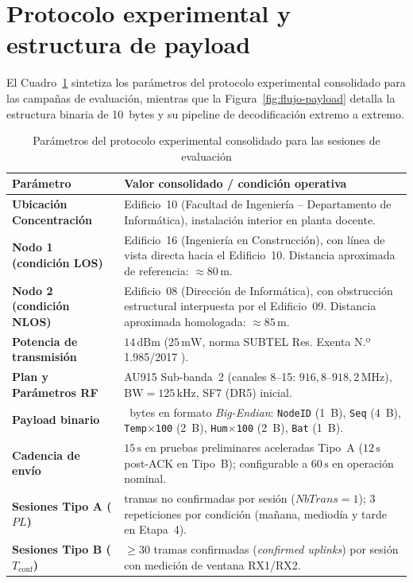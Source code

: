 \documentclass[12pt,oneside,openany,spanish,oldfontcommands]{memoir}
\renewcommand{\arraystretch}{1.15}
\begin{document}
\section{Protocolo experimental y estructura de payload}
\label{sec:protocolo-experimental}

El Cuadro~\ref{tab:protocolo} sintetiza los parámetros del protocolo experimental consolidado para
las campañas de evaluación, mientras que la Figura~\ref{fig:flujo-payload} detalla la estructura
binaria de 10~bytes y su pipeline de decodificación extremo a extremo.

\begin{table}[!htbp]
\centering
\caption{Parámetros del protocolo experimental consolidado para las sesiones de evaluación}
\label{tab:protocolo}
\footnotesize
\setlength{\tabcolsep}{3pt}
\renewcommand{\arraystretch}{1.02}
\begin{tabularx}{\textwidth}{
    >{\raggedright\arraybackslash}p{4.8cm}
    >{\raggedright\arraybackslash}X
}
\toprule
\textbf{Parámetro} & \textbf{Valor consolidado / condición operativa}\\
\midrule
\textbf{Ubicación Concentración} &
Edificio~10 (Facultad de Ingeniería -- Departamento de Informática), instalación interior en planta docente.\\
\midrule
\textbf{Nodo 1 (condición LOS)} &
Edificio~16 (Ingeniería en Construcción), con línea de vista directa hacia el Edificio~10. Distancia aproximada de referencia: $\approx 80\,\text{m}$.\\
\midrule
\textbf{Nodo 2 (condición NLOS)} &
Edificio~08 (Dirección de Informática), con obstrucción estructural interpuesta por el Edificio~09. Distancia aproximada homologada: $\approx 85\,\text{m}$.\\
\midrule
\textbf{Potencia de transmisión} &
$14\,\text{dBm}$ ($25\,\text{mW}$, norma SUBTEL Res. Exenta N.º 1.985/2017 \parencite{subtel2017}).\\
\midrule
\textbf{Plan y Parámetros RF} &
AU915 Sub-banda~2 (canales 8--15: $916,8\text{--}918,2\,\text{MHz}$), $\text{BW} = 125\,\text{kHz}$, SF7 (DR5) inicial.\\
\midrule
\textbf{Payload binario} &
10~bytes en formato \textit{Big-Endian}: \texttt{NodeID} (1~B), \texttt{Seq} (4~B), \texttt{Temp$\times$100} (2~B), \texttt{Hum$\times$100} (2~B), \texttt{Bat} (1~B).\\
\midrule
\textbf{Cadencia de envío} &
$15\,\text{s}$ en pruebas preliminares aceleradas Tipo~A ($12\,\text{s}$ post-ACK en Tipo~B); configurable a $60\,\text{s}$ en operación nominal.\\
\midrule
\textbf{Sesiones Tipo A ($PL$)} &
100 tramas no confirmadas por sesión ($NbTrans = 1$); 3 repeticiones por condición (mañana, mediodía y tarde en Etapa~4).\\
\midrule
\textbf{Sesiones Tipo B ($T_{\mathrm{conf}}$)} &
$\geq 30$ tramas confirmadas (\textit{confirmed uplinks}) por sesión con medición de ventana RX1/RX2.\\
\bottomrule
\end{tabularx}
\end{table}
\end{document}
